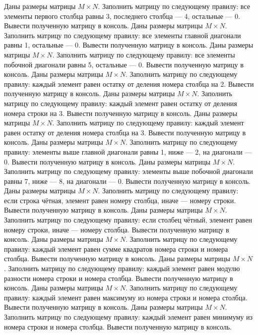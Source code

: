 Даны размеры матрицы $M \times N$. Заполнить матрицу по следующему правилу: все элементы первого столбца равны 3, последнего столбца --- 4, остальные --- 0. Вывести полученную матрицу в консоль.
Даны размеры матрицы $M \times N$. Заполнить матрицу по следующему правилу: все элементы главной диагонали равны 1, остальные --- 0. Вывести полученную матрицу в консоль.
Даны размеры матрицы $M \times N$. Заполнить матрицу по следующему правилу: все элементы побочной диагонали равны 5, остальные --- 0. Вывести полученную матрицу в консоль.
Даны размеры матрицы $M \times N$. Заполнить матрицу по следующему правилу: каждый элемент равен остатку от деления номера столбца на 2. Вывести полученную матрицу в консоль.
Даны размеры матрицы $M \times N$. Заполнить матрицу по следующему правилу: каждый элемент равен остатку от деления номера строки на 3. Вывести полученную матрицу в консоль.
Даны размеры матрицы $M \times N$. Заполнить матрицу по следующему правилу: каждый элемент равен остатку от деления номера столбца на 3. Вывести полученную матрицу в консоль.
Даны размеры матрицы $M \times N$. Заполнить матрицу по следующему правилу: элементы выше главной диагонали равны 1, ниже — 2, на диагонали — 0. Вывести полученную матрицу в консоль.
Даны размеры матрицы $M \times N$. Заполнить матрицу по следующему правилу: элементы выше побочной диагонали равны 7, ниже — 8, на диагонали — 0. Вывести полученную матрицу в консоль.
Даны размеры матрицы $M \times N$. Заполнить матрицу по следующему правилу: если строка чётная, элемент равен номеру столбца, иначе — номеру строки. Вывести полученную матрицу в консоль.
Даны размеры матрицы $M \times N$. Заполнить матрицу по следующему правилу: если столбец чётный, элемент равен номеру строки, иначе — номеру столбца. Вывести полученную матрицу в консоль.
Даны размеры матрицы $M \times N$. Заполнить матрицу по следующему правилу: каждый элемент равен сумме квадратов номера строки и номера столбца. Вывести полученную матрицу в консоль.
Даны размеры матрицы $M \times N$. Заполнить матрицу по следующему правилу: каждый элемент равен модулю разности номера строки и номера столбца. Вывести полученную матрицу в консоль.
Даны размеры матрицы $M \times N$. Заполнить матрицу по следующему правилу: каждый элемент равен максимуму из номера строки и номера столбца. Вывести полученную матрицу в консоль.
Даны размеры матрицы $M \times N$. Заполнить матрицу по следующему правилу: каждый элемент равен минимуму из номера строки и номера столбца. Вывести полученную матрицу в консоль.
